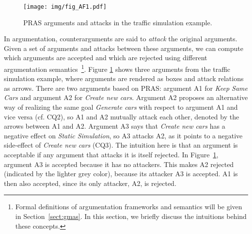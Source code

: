 \begin{figure}[t]
\centering
\texttt{[image: img/fig\_AF1.pdf]}
\caption{PRAS arguments and attacks in the traffic simulation example.}
\label{fig:pras:example}
\end{figure}

In argumentation, counterarguments are said to \emph{attack} the original arguments. Given a set of arguments and attacks between these arguments, we can compute which arguments are accepted and which are rejected using different argumentation semantics~\cite{Dung1995}\footnote{Formal definitions of argumentation frameworks and semantics will be given in Section~\ref{sect:gmas}. In this section, we briefly discuss the intuitions behind these concepts.}. Figure \ref{fig:pras:example} shows three arguments from the traffic simulation example, where arguments are rendered as boxes and attack relations as arrows. There are two arguments based on PRAS: argument A1 for \emph{Keep Same Cars} and argument A2 for \emph{Create new cars}. Argument A2 proposes an alternative way of realizing the same goal \emph{Generate cars} with respect to argument A1 and vice versa (cf. CQ2), so A1 and A2 mutually attack each other, denoted by the arrows between A1 and A2. Argument A3 says that \emph{Create new cars} has a negative effect on \emph{Static Simulation}, so A3 attacks A2, as it points to a negative side-effect of \emph{Create new cars} (CQ3). The intuition here is that an argument is acceptable if any argument that attacks it is itself rejected. In Figure~\ref{fig:pras:example}, argument A3 is accepted because it has no attackers. This makes A2 rejected (indicated by the lighter grey color), because its attacker A3 is accepted. A1 is then also accepted, since its only attacker, A2, is rejected. 


